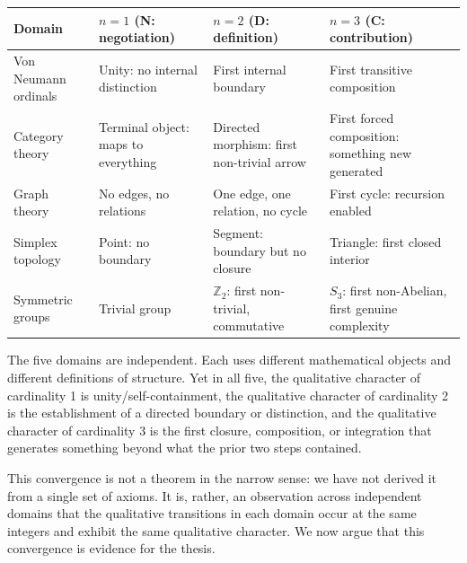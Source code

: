 \documentclass[12pt]{article}
\begin{document}
\begin{longtable}[]{@{}
  >{\raggedright\arraybackslash}p{}
  >{\raggedright\arraybackslash}p{}
  >{\raggedright\arraybackslash}p{}
  >{\raggedright\arraybackslash}p{}@{}}
\toprule\noalign{}
\begin{minipage}[b]{\linewidth}\raggedright
Domain
\end{minipage} & \begin{minipage}[b]{\linewidth}\raggedright
\(n = 1\) (N: negotiation)
\end{minipage} & \begin{minipage}[b]{\linewidth}\raggedright
\(n = 2\) (D: definition)
\end{minipage} & \begin{minipage}[b]{\linewidth}\raggedright
\(n = 3\) (C: contribution)
\end{minipage} \\
\midrule\noalign{}
\endhead
\bottomrule\noalign{}
\endlastfoot
Von Neumann ordinals & Unity: no internal distinction & First internal
boundary & First transitive composition \\
Category theory & Terminal object: maps to everything & Directed
morphism: first non-trivial arrow & First forced composition: something
new generated \\
Graph theory & No edges, no relations & One edge, one relation, no cycle
& First cycle: recursion enabled \\
Simplex topology & Point: no boundary & Segment: boundary but no closure
& Triangle: first closed interior \\
Symmetric groups & Trivial group & \(\mathbb{Z}_2\): first non-trivial,
commutative & \(S_3\): first non-Abelian, first genuine complexity \\
\end{longtable}

The five domains are independent. Each uses different mathematical
objects and different definitions of structure. Yet in all five, the
qualitative character of cardinality 1 is unity/self-containment, the
qualitative character of cardinality 2 is the establishment of a
directed boundary or distinction, and the qualitative character of
cardinality 3 is the first closure, composition, or integration that
generates something beyond what the prior two steps contained.

This convergence is not a theorem in the narrow sense: we have not
derived it from a single set of axioms. It is, rather, an observation
across independent domains that the qualitative transitions in each
domain occur at the same integers and exhibit the same qualitative
character. We now argue that this convergence is evidence for the
thesis.
\end{document}

